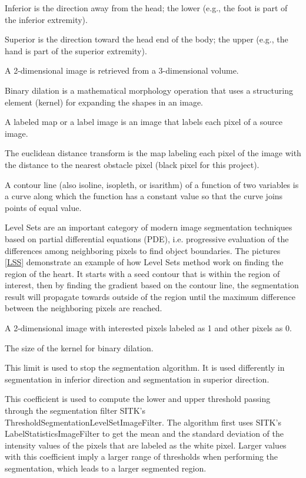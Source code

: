 \begin{description}[font=\rmfamily\bfseries, leftmargin=3cm, style=nextline]
	\item[Inferior] Inferior is the direction away from the head; the lower (e.g., the foot is part of the inferior extremity).
	\item[Superior] Superior is the direction toward the head end of the body; the upper (e.g., the hand is part of the superior extremity).
	\item[Slice] A 2-dimensional image is retrieved from a 3-dimensional volume.
	\item[Binary Dilation] Binary dilation is a mathematical morphology operation that uses a structuring element (kernel) for expanding the shapes in an image.
	\item[Label Map] A labeled map or a label image is an image that labels each pixel of a source image. 
	\item[Euclidean Distance Transform] The euclidean distance transform is the map labeling each pixel of the image with the distance to the nearest obstacle pixel (black pixel for this project).\
	\item[Contour Line] A contour line (also isoline, isopleth, or isarithm) of a function of two variables is a curve along which the function has a constant value so that the curve joins points of equal value.
	\item[Level Sets] Level Sets are an important category of modern image segmentation techniques based on partial differential equations (PDE), i.e. progressive evaluation of the differences among neighboring pixels to find object boundaries. The pictures \ref{LSS} demonstrate an example of how Level Sets method work on finding the region of the heart. It starts with a seed contour that is within the region of interest, then by finding the gradient based on the contour line, the segmentation result will propagate towards outside of the region until the maximum difference between the neighboring pixels are reached.	
	\item[Segmented slice] A 2-dimensional image with interested pixels labeled as 1 and other pixels as 0.	
	\item[Kernel Size] The size of the kernel for binary dilation.
	\item[Stop Limit] This limit is used to stop the segmentation algorithm. It is used differently in segmentation in inferior direction and segmentation in superior direction.
	\item[Threshold Coefficient] This coefficient is used to compute the lower and upper threshold passing through the segmentation filter SITK's ThresholdSegmentationLevelSetImageFilter. The algorithm first uses SITK's LabelStatisticsImageFilter to get the mean and the standard deviation of the intensity values of the pixels that are labeled as the white pixel. Larger values with this coefficient imply a larger range of thresholds when performing the segmentation, which leads to a larger segmented region.

\end{description}

